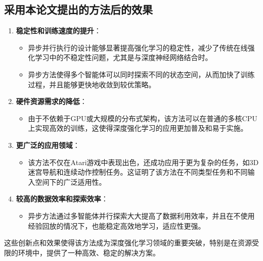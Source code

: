 \documentclass[twocolumn, 10pt]{article} %
\theoremstyle{remark}
\begin{document}
\subsection{采用本论文提出的方法后的效果}

\begin{enumerate}
    \item \textbf{稳定性和训练速度的提升}：
    \begin{itemize}
        \item 异步并行执行的设计能够显著提高强化学习的稳定性，减少了传统在线强化学习中的不稳定性问题，尤其是与深度神经网络结合时。
        \item 异步方法使得多个智能体可以同时探索不同的状态空间，从而加快了训练过程，并且能够更快地收敛到较优策略。
    \end{itemize}
    
    \item \textbf{硬件资源需求的降低}：
    \begin{itemize}
        \item 由于不依赖于GPU或大规模的分布式架构，该方法可以在普通的多核CPU上实现高效的训练，这使得深度强化学习的应用更加普及和易于实施。
    \end{itemize}
    
    \item \textbf{更广泛的应用领域}：
    \begin{itemize}
        \item 该方法不仅在Atari游戏中表现出色，还成功应用于更为复杂的任务，如3D迷宫导航和连续动作控制任务。这证明了该方法在不同类型任务和不同输入空间下的广泛适用性。
    \end{itemize}
    
    \item \textbf{较高的数据效率和探索效率}：
    \begin{itemize}
        \item 异步方法通过多智能体并行探索大大提高了数据利用效率，并且在不使用经验回放的情况下，也能稳定高效地学习，适应性更强。
    \end{itemize}
\end{enumerate}

这些创新点和效果使得该方法成为深度强化学习领域的重要突破，特别是在资源受限的环境中，提供了一种高效、稳定的解决方案。
\end{document}
